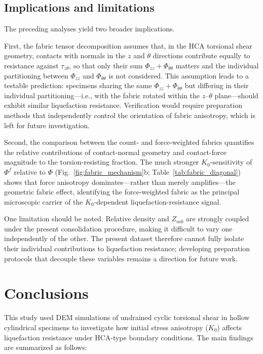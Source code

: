 \documentclass[a4paper,fleqn]{cas-sc}
\newcommand{\Kzero}{\ensuremath{K_0}}
\begin{document}
\subsection{Implications and limitations}
\label{subsec:limitations}

The preceding analyses yield two broader implications.

First, the fabric tensor decomposition assumes that, in the HCA torsional shear geometry, contacts with normals in the $z$ and $\theta$ directions contribute equally to resistance against $\tau_{z\theta}$, so that only their sum $\Phi_{zz} + \Phi_{\theta\theta}$ matters and the individual partitioning between $\Phi_{zz}$ and $\Phi_{\theta\theta}$ is not considered. This assumption leads to a testable prediction: specimens sharing the same $\Phi_{zz} + \Phi_{\theta\theta}$ but differing in their individual partitioning---i.e., with the fabric rotated within the $z$--$\theta$ plane---should exhibit similar liquefaction resistance. Verification would require preparation methods that independently control the orientation of fabric anisotropy, which is left for future investigation.

Second, the comparison between the count- and force-weighted fabrics quantifies the relative contributions of contact-normal geometry and contact-force magnitude to the torsion-resisting fraction. The much stronger \Kzero{}-sensitivity of $\Phi^f$ relative to $\Phi$ (Fig.~\ref{fig:fabric_mechanism}b; Table~\ref{tab:fabric_diagonal}) shows that force anisotropy dominates---rather than merely amplifies---the geometric fabric effect, identifying the force-weighted fabric as the principal microscopic carrier of the \Kzero{}-dependent liquefaction-resistance signal.

One limitation should be noted. Relative density and $Z_{m0}$ are strongly coupled under the present consolidation procedure, making it difficult to vary one independently of the other. The present dataset therefore cannot fully isolate their individual contributions to liquefaction resistance; developing preparation protocols that decouple these variables remains a direction for future work.

\section{Conclusions}
\label{sec:conclusions}

This study used DEM simulations of undrained cyclic torsional shear in hollow cylindrical specimens to investigate how initial stress anisotropy (\Kzero{}) affects liquefaction resistance under HCA-type boundary conditions. The main findings are summarized as follows:
\end{document}
